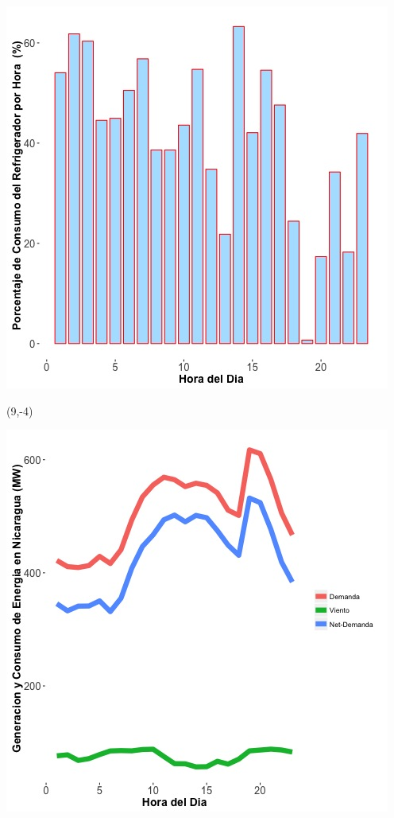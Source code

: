 \documentclass{article}\usepackage[]{graphicx}\usepackage[]{color}
\newenvironment{knitrout}{}{} %
\begin{document}
\begin{knitrout}
\color{fgcolor}
\includegraphics[scale=0.65]{figure/A17_fridge_energy_pct.jpg} 
\end{knitrout}

 \begin{textblock}{1}(9,-4)
\begin{minipage}{20em}
\begingroup

\endgroup
\end{minipage}
\end{textblock}

\begin{knitrout}
\color{fgcolor}
\includegraphics[scale=0.65]{figure/gridplot1.jpg} 
\end{knitrout}
\end{document}
